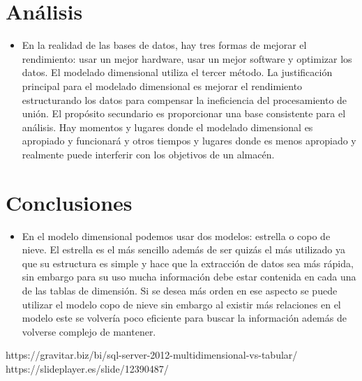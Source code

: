 \documentclass[%
 reprint,
 amsmath,amssymb,
 aps,
]{revtex4-1}
\begin{document}
\section{Análisis}

\begin{itemize}
\item
En la realidad de las bases de datos, hay tres formas de mejorar el rendimiento: usar un mejor hardware, usar un mejor software y optimizar los datos. El modelado dimensional utiliza el tercer método. La justificación principal para el modelado dimensional es mejorar el rendimiento estructurando los datos para compensar la ineficiencia del procesamiento de unión. El propósito secundario es proporcionar una base consistente para el análisis. Hay momentos y lugares donde el modelado dimensional es apropiado y funcionará y otros tiempos y lugares donde es menos apropiado y realmente puede interferir con los objetivos de un almacén. 

\end{itemize}
\section{Conclusiones}

\begin{itemize}
\item 
En el modelo dimensional podemos usar dos modelos: estrella o copo de nieve. El estrella es el más sencillo además de ser quizás el más utilizado ya que su estructura es simple y hace que la extracción de datos sea más rápida, sin embargo para su uso mucha información debe estar contenida en cada una de las tablas de dimensión. Si se desea más orden en ese aspecto se puede utilizar el modelo copo de nieve sin embargo al existir más relaciones en el modelo este se volvería poco eficiente para buscar la información además de volverse complejo de mantener.

\end{itemize}





https://gravitar.biz/bi/sql-server-2012-multidimensional-vs-tabular/
https://slideplayer.es/slide/12390487/
\end{document}
